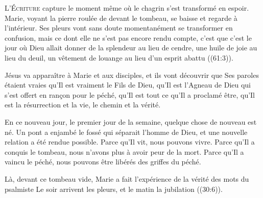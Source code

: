 \dvrule







\lettrine{L}{'Écriture} capture le moment même où le chagrin
 s'est transformé en espoir. Marie, voyant la pierre roulée
 de devant le tombeau, se baisse et regarde à l'intérieur.
 Ses pleurs vont sans doute momentanément se transformer en confusion,
 mais ce dont elle ne s'est pas encore rendu compte,
 c'est que c'est le jour où Dieu allait donner \Og de la splendeur
 au lieu de cendre, une huile de joie au lieu du deuil,
 un vêtement de louange au lieu d'un esprit abattu \Fg{}
 ((61:3)).


Jésus va apparaître à Marie et aux disciples, et ils vont découvrir
 que Ses paroles étaient vraies \ocadr qu'Il est vraiment le Fils de Dieu,
 qu'Il est l'Agneau de Dieu qui s'est offert en ran\c{c}on pour le péché,
 qu'Il est tout ce qu'Il a proclamé être, qu'Il est la résurrection et la vie,
 le chemin et la vérité.

En ce nouveau jour, le premier jour de la semaine,
 quelque chose de nouveau est né. Un pont a enjambé le fossé
 qui séparait l'homme de Dieu, et une nouvelle relation a été rendue possible.
 Parce qu'Il vit, nous pouvons vivre. Parce qu'Il a conquis le tombeau,
 nous n'avons plus à avoir peur de la mort. Parce qu'Il a vaincu le péché,
 nous pouvons être libérés des griffes du péché.

Là, devant ce tombeau vide, Marie a fait l'expérience de la vérité
 des mots du psalmiste\frcolon{}
 \Og Le soir arrivent les pleurs, et le matin la jubilation \Fg{}
 ((30:6)).

\dvrule




